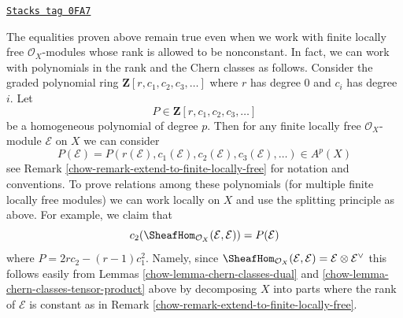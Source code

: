 \begin{remark}
\label{chow-remark-equalities-nonconstant-rank}
\href{https://stacks.math.columbia.edu/tag/0FA7}{\texttt{Stacks tag 0FA7}}

The equalities proven above remain true even when we work with
finite locally free
$\mathcal{O}_X$-modules whose rank is allowed to be nonconstant.
In fact, we can work with polynomials in the rank and the
Chern classes as follows. Consider the  graded polynomial ring
$\mathbf{Z}[r, c_1, c_2, c_3, \ldots]$
where $r$ has degree $0$ and $c_i$ has degree $i$. Let
$$
P \in \mathbf{Z}[r, c_1, c_2, c_3, \ldots]
$$
be a homogeneous polynomial of degree $p$. Then for any finite locally
free $\mathcal{O}_X$-module $\mathcal{E}$ on $X$ we can consider
$$
P(\mathcal{E}) =
P(r(\mathcal{E}), c_1(\mathcal{E}), c_2(\mathcal{E}), c_3(\mathcal{E}), \ldots)
\in A^p(X)
$$
see Remark \ref{chow-remark-extend-to-finite-locally-free} for notation and
conventions. To prove relations among these polynomials (for multiple
finite locally free modules) we can work locally on $X$ and use the splitting
principle as above. For example, we claim that
$$
c_2(\SheafHom_{\mathcal{O}_X}(\mathcal{E}, \mathcal{E})) =
P(\mathcal{E})
$$
where $P = 2rc_2 - (r - 1)c_1^2$.
Namely, since $\SheafHom_{\mathcal{O}_X}(\mathcal{E}, \mathcal{E}) =
\mathcal{E} \otimes \mathcal{E}^\vee$ this follows easily from
Lemmas \ref{chow-lemma-chern-classes-dual} and
\ref{chow-lemma-chern-classes-tensor-product}
above by decomposing $X$ into parts where the rank
of $\mathcal{E}$ is constant as in
Remark \ref{chow-remark-extend-to-finite-locally-free}.
\end{remark}

